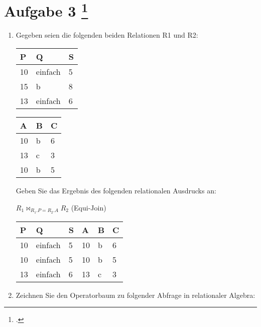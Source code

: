 \documentclass{lehramt-informatik-aufgabe}
\begin{document}
\liAufgabenTitel{}
\section{Aufgabe 3
\footcite{66116:2021:03}}

\begin{enumerate}


\item Gegeben seien die folgenden beiden Relationen R1 und R2:


\begin{tabular}{|l|l|l|}
\hline
P  & Q       & S \\ \hline
10 & einfach & 5 \\ \hline
15 & b       & 8 \\ \hline
13 & einfach & 6 \\ \hline
\end{tabular}


\begin{tabular}{|l|l|l|}
\hline
A  & B & C \\ \hline
10 & b & 6 \\ \hline
13 & c & 3 \\ \hline
10 & b & 5 \\ \hline
\end{tabular}

Geben Sie das Ergebnis des folgenden relationalen Ausdrucks an:

\begin{center}
$R_1 \bowtie_ {R_1.P = R_2.A} R_2$ (Equi-Join)
\end{center}

\begin{liAntwort}
\begin{tabular}{|l|l|l|l|l|l|}
\hline
P  & Q       & S & A  & B & C \\ \hline
10 & einfach & 5 & 10 & b & 6 \\ \hline
10 & einfach & 5 & 10 & b & 5 \\ \hline
13 & einfach & 6 & 13 & c & 3 \\ \hline
\end{tabular}
\end{liAntwort}


\item Zeichnen Sie den Operatorbaum zu folgender Abfrage in relationaler Algebra:


\end{enumerate}
\end{document}
